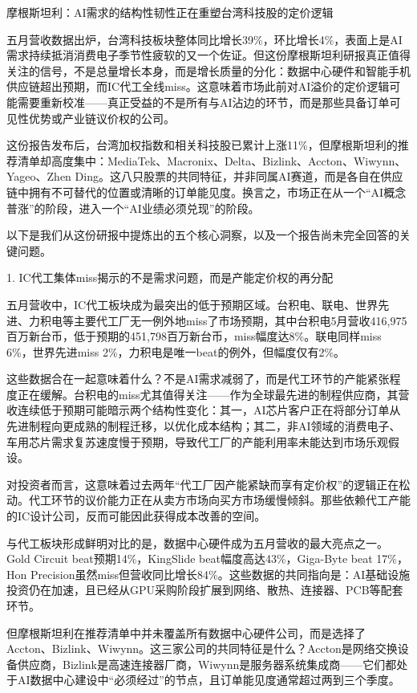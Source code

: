 \documentclass[11pt]{ctexart}
\begin{document}
摩根斯坦利：AI需求的结构性韧性正在重塑台湾科技股的定价逻辑

五月营收数据出炉，台湾科技板块整体同比增长39\%，环比增长4\%，表面上是AI需求持续抵消消费电子季节性疲软的又一个佐证。但这份摩根斯坦利研报真正值得关注的信号，不是总量增长本身，而是增长质量的分化：数据中心硬件和智能手机供应链超出预期，而IC代工全线miss。这意味着市场此前对AI溢价的定价逻辑可能需要重新校准——真正受益的不是所有与AI沾边的环节，而是那些具备订单可见性优势或产业链议价权的公司。

这份报告发布后，台湾加权指数和相关科技股已累计上涨11\%，但摩根斯坦利的推荐清单却高度集中：MediaTek、Macronix、Delta、Bizlink、Accton、Wiwynn、Yageo、Zhen Ding。这八只股票的共同特征，并非同属AI赛道，而是各自在供应链中拥有不可替代的位置或清晰的订单能见度。换言之，市场正在从一个“AI概念普涨”的阶段，进入一个“AI业绩必须兑现”的阶段。

以下是我们从这份研报中提炼出的五个核心洞察，以及一个报告尚未完全回答的关键问题。

1. IC代工集体miss揭示的不是需求问题，而是产能定价权的再分配

五月营收中，IC代工板块成为最突出的低于预期区域。台积电、联电、世界先进、力积电等主要代工厂无一例外地miss了市场预期，其中台积电5月营收416,975百万新台币，低于预期的451,798百万新台币，miss幅度达8\%。联电同样miss 6\%，世界先进miss 2\%，力积电是唯一beat的例外，但幅度仅有2\%。

这些数据合在一起意味着什么？不是AI需求减弱了，而是代工环节的产能紧张程度正在缓解。台积电的miss尤其值得关注——作为全球最先进的制程供应商，其营收连续低于预期可能暗示两个结构性变化：其一，AI芯片客户正在将部分订单从先进制程向更成熟的制程迁移，以优化成本结构；其二，非AI领域的消费电子、车用芯片需求复苏速度慢于预期，导致代工厂的产能利用率未能达到市场乐观假设。

对投资者而言，这意味着过去两年“代工厂因产能紧缺而享有定价权”的逻辑正在松动。代工环节的议价能力正在从卖方市场向买方市场缓慢倾斜。那些依赖代工产能的IC设计公司，反而可能因此获得成本改善的空间。

与代工板块形成鲜明对比的是，数据中心硬件成为五月营收的最大亮点之一。Gold Circuit beat预期14\%，KingSlide beat幅度高达43\%，Giga-Byte beat 17\%，Hon Precision虽然miss但营收同比增长84\%。这些数据的共同指向是：AI基础设施投资仍在加速，且已经从GPU采购阶段扩展到网络、散热、连接器、PCB等配套环节。

但摩根斯坦利在推荐清单中并未覆盖所有数据中心硬件公司，而是选择了Accton、Bizlink、Wiwynn。这三家公司的共同特征是什么？Accton是网络交换设备供应商，Bizlink是高速连接器厂商，Wiwynn是服务器系统集成商——它们都处于AI数据中心建设中“必须经过”的节点，且订单能见度通常超过两到三个季度。
\end{document}
